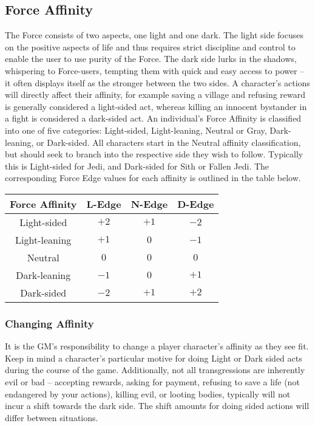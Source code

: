 \documentclass[a4paper,10pt,final,twocolumn,oneside]{book}
\begin{document}
\subsection{Force Affinity} %
\label{sub:forceAffinity}
The Force consists of two aspects, one light and one dark. The light side focuses on the positive aspects of life and thus requires strict discipline and control to enable the user to use purity of the Force. The dark side lurks in the shadows, whispering to Force-users, tempting them with quick and easy access to power -- it often displays itself as the stronger between the two sides. A character's actions will directly affect their affinity, for example saving a village and refusing reward is generally considered a light-sided act, whereas killing an innocent bystander in a fight is considered a dark-sided act. An individual's Force Affinity is classified into one of five categories: Light-sided, Light-leaning, Neutral or Gray, Dark-leaning, or Dark-sided. All characters start in the Neutral affinity classification, but should seek to branch into the respective side they wish to follow. Typically this is Light-sided for Jedi, and Dark-sided for Sith or Fallen Jedi. The corresponding Force Edge values for each affinity is outlined in the table below.
	
\begin{center}
\begin{tabular}{ |c|c|c|c| }
\hline
\textbf{Force Affinity} & \textbf{L-Edge} & \textbf{N-Edge} & \textbf{D-Edge} \\
\hline \hline
Light-sided 	& $+2$ 	& $+1$ 	& $-2$	\\
\hline
Light-leaning 	& $+1$ 	& $0$ 	& $-1$	\\
\hline
Neutral		 	& $0$ 	& $0$ 	& $0$ 	\\
\hline
Dark-leaning 	& $-1$ 	& $0$ 	& $+1$ 	\\
\hline
Dark-sided 		& $-2$ 	& $+1$ 	& $+2$ 	\\
\hline
\end{tabular}
\end{center}


\subsubsection{Changing Affinity} %
\label{subsub:changingAffinity}
It is the GM's responsibility to change a player character's affinity as they see fit. Keep in mind a character's particular motive for doing Light or Dark sided acts during the course of the game. Additionally, not all transgressions are inherently evil or bad -- accepting rewards, asking for payment, refusing to save a life (not endangered by your actions), killing evil, or looting bodies, typically will not incur a shift towards the dark side. The shift amounts for doing sided actions will differ between situations.
\end{document}
